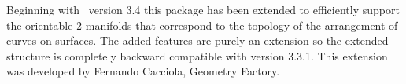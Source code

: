 
{\XHDS
Beginning with \cgal\ version 3.4 this package has been extended
to efficiently support the orientable-2-manifolds that correspond to the topology 
of the arrangement of curves on surfaces.
The added features are purely an extension so the extended structure is completely 
backward compatible with version 3.3.1.
This extension was developed by Fernando Cacciola, Geometry Factory.
}
